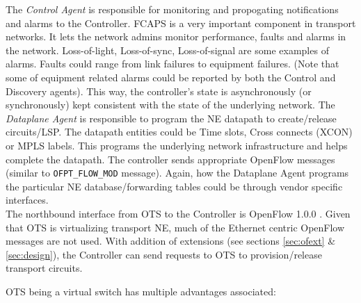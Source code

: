 \documentclass{sig-alternate-10pt}
\begin{document}
	The \textit{Control Agent} is responsible for monitoring and propogating notifications and alarms to the
	Controller. FCAPS is a very important component in transport networks. It lets the network admins monitor
	performance, faults and alarms in the network. Loss-of-light, Loss-of-sync, Loss-of-signal are some
	examples of alarms. Faults could range from link failures to equipment failures. (Note that some of
	equipment related alarms could be reported by both the Control and Discovery agents). This way, the
	controller's state is asynchronously (or synchronously) kept consistent with the state of the underlying
	network. The \textit{Dataplane Agent} is responsible to program the NE datapath to create/release
	circuits/LSP. The datapath entities could be Time slots, Cross connects (XCON) or MPLS labels. This
	programs the underlying network infrastructure and helps complete the datapath. The controller sends
	appropriate OpenFlow messages (similar to \texttt{OFPT\_FLOW\_MOD} message). Again, how the Dataplane
	Agent programs the particular NE database/forwarding tables could be through vendor specific interfaces. \\
	
	The northbound interface from OTS to the Controller is OpenFlow 1.0.0 \cite{OF1.0}. Given that OTS is
	virtualizing transport NE, much of the Ethernet centric OpenFlow messages are not used. With addition of
	extensions (see sections \ref{sec:ofext} \& \ref{sec:design}), the Controller can send requests to OTS
	to provision/release transport circuits.
	
	OTS being a virtual switch has multiple advantages associated:
\end{document}
